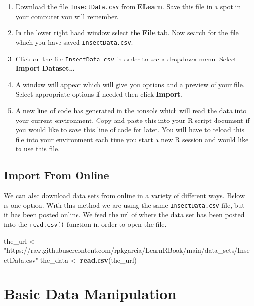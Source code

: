 \documentclass[
]{book}
\newenvironment{Shaded}{\begin{snugshade}}{\end{snugshade}}
\newcommand{\KeywordTok}[1]{\textcolor[rgb]{0.13,0.29,0.53}{\textbf{#1}}}
\newcommand{\NormalTok}[1]{#1}
\newcommand{\StringTok}[1]{\textcolor[rgb]{0.31,0.60,0.02}{#1}}
\begin{document}
\begin{enumerate}
\def\labelenumi{\arabic{enumi})}
\item
  Download the file \texttt{InsectData.csv} from \textbf{ELearn}. Save this file in a spot in your computer you will remember.
\item
  In the lower right hand window select the \textbf{File} tab. Now search for the file which you have saved \texttt{InsectData.csv}.
\item
  Click on the file \texttt{InsectData.csv} in order to see a dropdown menu. Select \textbf{Import Dataset\ldots{}}
\item
  A window will appear which will give you options and a preview of your file. Select appropriate options if needed then click \textbf{Import}.
\item
  A new line of code has generated in the console which will read the data into your current environment. Copy and paste this into your R script document if you would like to save this line of code for later. You will have to reload this file into your environment each time you start a new R session and would like to use this file.
\end{enumerate}

\hypertarget{import-from-online}{%
\subsection*{Import From Online}\label{import-from-online}}

We can also download data sets from online in a variety of different ways. Below is one option. With this method we are using the same \texttt{InsectData.csv} file, but it has been posted online. We feed the url of where the data set has been posted into the \texttt{read.csv()} function in order to open the file.

\begin{Shaded}
\begin{Highlighting}[]
\NormalTok{the_url <-}\StringTok{ "https://raw.githubusercontent.com/rpkgarcia/LearnRBook/main/data_sets/InsectData.csv"}
\NormalTok{the_data <-}\StringTok{ }\KeywordTok{read.csv}\NormalTok{(the_url)}
\end{Highlighting}
\end{Shaded}

\hypertarget{basic-data-manipulation}{%
\section{Basic Data Manipulation}\label{basic-data-manipulation}}
\end{document}
